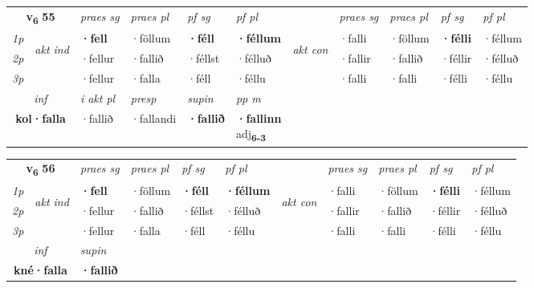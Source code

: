 \noindent
\begin{tabular}{lllllllllll} \toprule
\multicolumn{2}{c}{\textbf{v{\textsubscript{6}}} \Large{\textbf{55}}}  &  \textit{praes sg}  & \textit{praes pl}  &\textit{ pf sg} & \textit{pf pl} &  &  \textit{praes sg}  & \textit{praes pl}  & \textit{pf sg} & \textit{pf pl } \\*
	\cmidrule{3-6} \cmidrule{8-11}
 {\textit{1p}} & \multirow{3}{*}{\begin{turn}{90}\textit{akt ind}\end{turn}} & \textbf{·fell} & ·föllum & \textbf{·féll} & \textbf{·féllum} & \multirow{3}{*}{\begin{turn}{90}\textit{akt con}\end{turn}} &·falli & ·föllum & \textbf{·félli} & ·féllum\\*
 {\textit{2p}} &  &  ·fellur  & ·fallið & ·féllst & ·félluð & & ·fallir & ·fallið & ·féllir & ·félluð \\*
{\textit{3p}} &  & ·fellur & ·falla & ·féll & ·féllu & & ·falli & ·falli& ·félli & ·féllu \\*
\cmidrule{3-6} \cmidrule{8-11}

   \multicolumn{2}{c}{\textit{inf}}  & \textit{i akt pl}   & \textit{presp} & \textit{supin}  & \textit{pp m} \\*
  \multicolumn{2}{c}{\textbf{kol\allowbreak ·falla}}   & ·fallið   & ·fallandi &  \textbf{·fallið}  & \specialcell{\textbf{·fallinn} \\ adj\textbf{\textsubscript{6-3}}} \\*
\end{tabular}

\noindent
\begin{tabular}{lllllllllll} \toprule
\multicolumn{2}{c}{\textbf{v{\textsubscript{6}}} \Large{\textbf{56}}}  &  \textit{praes sg}  & \textit{praes pl}  &\textit{ pf sg} & \textit{pf pl} &  &  \textit{praes sg}  & \textit{praes pl}  & \textit{pf sg} & \textit{pf pl } \\*
	\cmidrule{3-6} \cmidrule{8-11}
 {\textit{1p}} & \multirow{3}{*}{\begin{turn}{90}\textit{akt ind}\end{turn}} & \textbf{·fell} & ·föllum & \textbf{·féll} & \textbf{·féllum} & \multirow{3}{*}{\begin{turn}{90}\textit{akt con}\end{turn}} &·falli & ·föllum & \textbf{·félli} & ·féllum\\*
 {\textit{2p}} &  &  ·fellur  & ·fallið & ·féllst & ·félluð & & ·fallir & ·fallið & ·féllir & ·félluð \\*
{\textit{3p}} &  & ·fellur & ·falla & ·féll & ·féllu & & ·falli & ·falli& ·félli & ·féllu \\*
\cmidrule{3-6} \cmidrule{8-11}

   \multicolumn{2}{c}{\textit{inf}}      & \textit{supin}   \\*
  \multicolumn{2}{c}{\textbf{kné\allowbreak ·falla}}       &  \textbf{·fallið}   \\*
\end{tabular}

